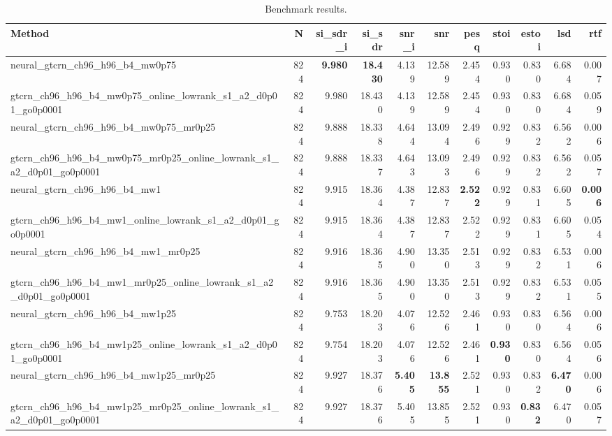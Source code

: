 \begin{table}[t]
\centering
\caption{Benchmark results.}
\label{tab:bench}
\begin{tabular}{lrrrrrrrrrr}
\toprule
Method & N & si\_sdr\_i & si\_sdr & snr\_i & snr & pesq & stoi & estoi & lsd & rtf \\
\midrule
neural_gtcrn_ch96_h96_b4_mw0p75 & 824 & \textbf{9.980} & \textbf{18.430} & 4.139 & 12.589 & 2.454 & 0.930 & 0.830 & 6.684 & 0.007 \\
gtcrn_ch96_h96_b4_mw0p75_online_lowrank_s1_a2_d0p01_go0p0001 & 824 & 9.980 & 18.430 & 4.139 & 12.589 & 2.454 & 0.930 & 0.830 & 6.684 & 0.059 \\
neural_gtcrn_ch96_h96_b4_mw0p75_mr0p25 & 824 & 9.888 & 18.338 & 4.644 & 13.094 & 2.496 & 0.929 & 0.832 & 6.562 & 0.006 \\
gtcrn_ch96_h96_b4_mw0p75_mr0p25_online_lowrank_s1_a2_d0p01_go0p0001 & 824 & 9.888 & 18.337 & 4.643 & 13.093 & 2.496 & 0.929 & 0.832 & 6.562 & 0.057 \\
neural_gtcrn_ch96_h96_b4_mw1 & 824 & 9.915 & 18.364 & 4.387 & 12.837 & \textbf{2.522} & 0.929 & 0.831 & 6.605 & \textbf{0.006} \\
gtcrn_ch96_h96_b4_mw1_online_lowrank_s1_a2_d0p01_go0p0001 & 824 & 9.915 & 18.364 & 4.387 & 12.837 & 2.522 & 0.929 & 0.831 & 6.605 & 0.054 \\
neural_gtcrn_ch96_h96_b4_mw1_mr0p25 & 824 & 9.916 & 18.365 & 4.900 & 13.350 & 2.513 & 0.929 & 0.832 & 6.531 & 0.006 \\
gtcrn_ch96_h96_b4_mw1_mr0p25_online_lowrank_s1_a2_d0p01_go0p0001 & 824 & 9.916 & 18.365 & 4.900 & 13.350 & 2.513 & 0.929 & 0.832 & 6.531 & 0.055 \\
neural_gtcrn_ch96_h96_b4_mw1p25 & 824 & 9.753 & 18.203 & 4.076 & 12.526 & 2.461 & 0.930 & 0.830 & 6.564 & 0.006 \\
gtcrn_ch96_h96_b4_mw1p25_online_lowrank_s1_a2_d0p01_go0p0001 & 824 & 9.754 & 18.203 & 4.076 & 12.526 & 2.461 & \textbf{0.930} & 0.830 & 6.564 & 0.056 \\
neural_gtcrn_ch96_h96_b4_mw1p25_mr0p25 & 824 & 9.927 & 18.376 & \textbf{5.405} & \textbf{13.855} & 2.521 & 0.930 & 0.832 & \textbf{6.470} & 0.006 \\
gtcrn_ch96_h96_b4_mw1p25_mr0p25_online_lowrank_s1_a2_d0p01_go0p0001 & 824 & 9.927 & 18.376 & 5.405 & 13.855 & 2.521 & 0.930 & \textbf{0.832} & 6.470 & 0.057 \\
\bottomrule
\end{tabular}
\end{table}